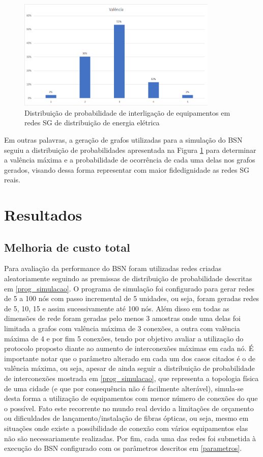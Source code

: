 \begin{figure} [ht]%
	\centering
	\includegraphics[width=0.85\textwidth]{./figuras/Distribuicao-prob.png}
	\caption[Distribuição de probabilidade]{Distribuição de probabilidade de interligação de equipamentos em redes SG de distribuição de energia elétrica}
	\label{fig_dist_prob}
\end{figure}

Em outras palavras, a geração de grafos utilizadas para a simulação do BSN seguiu a distribuição de probabilidades apresentada na Figura \ref{fig_dist_prob} para determinar a valência máxima e a probabilidade de ocorrência de cada uma delas nos grafos gerados, visando dessa forma representar com maior fidedignidade as redes SG reais.

\section{Resultados}
\label{resultados}
\subsection{Melhoria de custo total}
\label{melhoria-custo-total}
Para avaliação da performance do BSN foram utilizadas redes criadas aleatoriamente seguindo as premissas de distribuição de probabilidade descritas em \ref{prog_simulacao}. O programa de simulação foi configurado para gerar redes de 5 a 100 nós com passo incremental de 5 unidades, ou seja, foram geradas redes de 5, 10, 15 e assim sucessivamente até 100 nós. Além disso em todas as dimensões de rede foram geradas pelo menos 3 amostras onde uma delas foi limitada a grafos com valência máxima de 3 conexões, a outra com valência máxima de 4 e por fim 5 conexões, tendo por objetivo avaliar a utilização do protocolo proposto diante ao aumento de interconexões máximas em cada nó. É importante notar que o parâmetro alterado em cada um dos casos citados é o de valência máxima, ou seja, apesar de ainda seguir a distribuição de probabilidade de interconexões mostrada em \ref{prog_simulacao}, que representa a topologia física de uma cidade (e que por consequência não é facilmente alterável), simula-se desta forma a utilização de equipamentos com menor número de conexões do que o possível. Fato este recorrente no mundo real devido a limitações de orçamento ou dificuldades de lançamento/instalação de fibras ópticas, ou seja, mesmo em situações onde existe a possibilidade de conexão com vários equipamentos elas não são necessariamente realizadas. Por fim, cada uma das redes foi submetida à execução do BSN configurado com os parâmetros descritos em \ref{parametros}.

